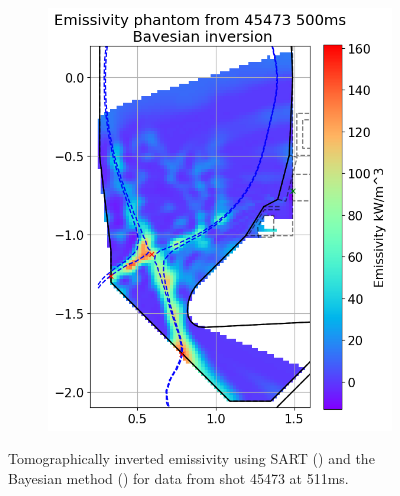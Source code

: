 \begin{figure}
\begin{subfigure}{0.45\linewidth}
         \includegraphics[trim={0 0 0 43},clip,width=\textwidth]{Chapters/chapter2/figs/inversion_comparison_emissivity_real_data_test-Bayes.png}
         \caption{}
         \label{fig:real_phantom2b}
     \end{subfigure}
    \caption{Tomographically inverted emissivity using SART () and the Bayesian method () for data from shot 45473 at 511ms.}
    \label{fig:real_phantom2}
\end{figure}

